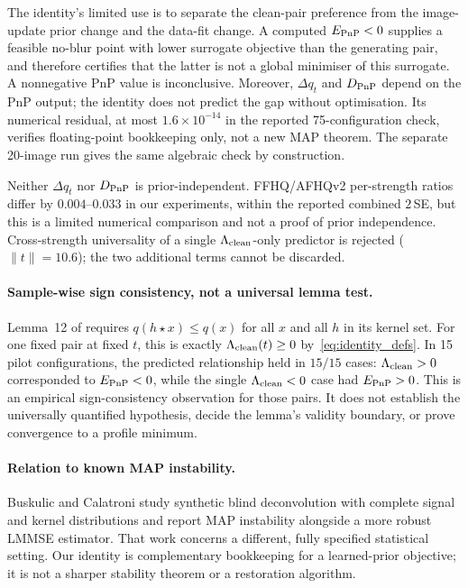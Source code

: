 \documentclass[10pt,journal]{IEEEtran}
\newcommand{\blur}{\star}
\newcommand{\Lam}{\Lambda}
\begin{document}
The identity's limited use is to separate the clean-pair preference from the image-update prior
change and the data-fit change. A computed $E_{\rm PnP}<0$ supplies a feasible no-blur point
with lower surrogate objective than the generating pair, and therefore certifies that the
latter is not a global minimiser of this surrogate. A nonnegative PnP value is inconclusive.
Moreover, $\Delta q_t$ and $D_{\rm PnP}$ depend on the PnP output; the identity does not predict
the gap without optimisation. Its numerical residual, at most $1.6\times10^{-14}$ in the
reported 75-configuration check, verifies floating-point bookkeeping only, not a new MAP
theorem. The separate 20-image run gives the same algebraic check by construction.

Neither $\Delta q_t$ nor $D_{\rm PnP}$ is prior-independent. FFHQ/AFHQv2 per-strength ratios
differ by $0.004$--$0.033$ in our experiments, within the reported combined $2\,$SE, but this is
a limited numerical comparison and not a proof of prior independence. Cross-strength
universality of a single $\Lam_{\rm clean}$-only predictor is rejected ($\|t\|=10.6$); the two
additional terms cannot be discarded.

\paragraph*{Sample-wise sign consistency, not a universal lemma test.}
Lemma~12 of \cite{nguyen2025morsebott} requires $q(h\blur x)\le q(x)$ for all $x$ and all $h$
in its kernel set. For one fixed pair at fixed $t$, this is exactly
$\Lam_{\rm clean}(t)\ge0$ by~\eqref{eq:identity_defs}. In 15 pilot configurations, the
predicted relationship held in $15/15$ cases: $\Lam_{\rm clean}>0$ corresponded to
$E_{\rm PnP}<0$, while the single $\Lam_{\rm clean}<0$ case had $E_{\rm PnP}>0$. This is an
empirical sign-consistency observation for those pairs. It does not establish the universally
quantified hypothesis, decide the lemma's validity boundary, or prove convergence to a profile
minimum.

\paragraph*{Relation to known MAP instability.}
Buskulic and Calatroni \cite{buskulic2026maplmmse} study synthetic blind deconvolution with
complete signal and kernel distributions and report MAP instability alongside a more robust
LMMSE estimator. That work concerns a different, fully specified statistical setting. Our
identity is complementary bookkeeping for a learned-prior objective; it is not a sharper
stability theorem or a restoration algorithm.
\end{document}
